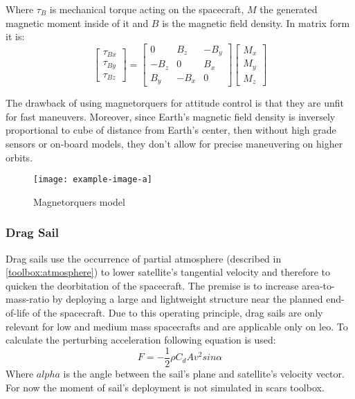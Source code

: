         Where $\tau_B$ is mechanical torque acting on the spacecraft, $M$ the generated magnetic moment inside of it and $B$ is the magnetic field density. In matrix form it is:
        \begin{equation}
            \begin{bmatrix}
            \tau_{Bx}\\ 
            \tau_{By}\\ 
            \tau_{Bz}
            \end{bmatrix}
            =
            \begin{bmatrix}
            0 & B_z & -B_y\\ 
            -B_z & 0 & B_x\\ 
            B_y & -B_x & 0
            \end{bmatrix}
            \begin{bmatrix}
            M_x\\
            M_y\\
            M_z
            \end{bmatrix}                
        \end{equation}


        The drawback of using magnetorquers for attitude control is that they are unfit for fast maneuvers. Moreover, since Earth's magnetic field density is inversely proportional to cube of distance from Earth's center, then without high grade sensors or on-board models, they don't allow for precise maneuvering on higher orbits.

        \begin{figure}[H]
            \centering
            \texttt{[image: example-image-a]}
            \caption{Magnetorquers model}
            \label{fig:mag_simulink}
        \end{figure}


    \subsubsection{Drag Sail}
        Drag sails use the occurrence of partial atmosphere (described in \ref{toolbox:atmosphere}) to lower satellite's tangential velocity and therefore to quicken the deorbitation of the spacecraft. The premise is to increase area-to-mass-ratio by deploying a large and lightweight structure near the planned end-of-life of the spacecraft. Due to this operating principle, drag sails are only relevant for low and medium mass spacecrafts and are applicable only on \ac{leo}. To calculate the perturbing acceleration following equation is used:
        \begin{equation}
            F = -\frac{1}{2}\rho C_d A v^2sin\alpha
        \end{equation}
        Where $alpha$ is the angle between the sail's plane and satellite's velocity vector. For now the moment of sail's deployment is not simulated in \ac{scars} toolbox.

